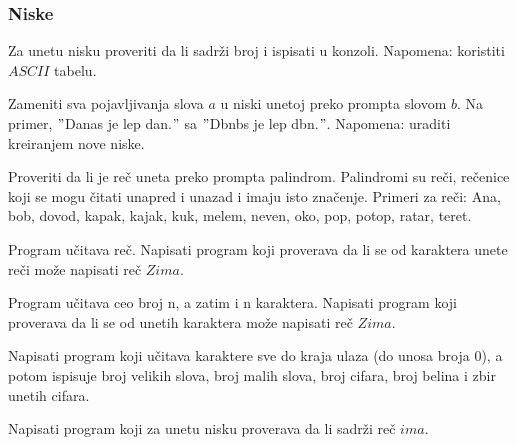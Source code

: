 \subsubsection{Niske}
\begin{primer}
Za unetu nisku proveriti da li sadrži broj i ispisati u konzoli. Napomena: koristiti $ASCII$ tabelu.
\end{primer}

\begin{primer}
Zameniti sva pojavljivanja slova $a$ u niski unetoj preko prompta slovom $b$. Na primer, $"$Danas je lep dan.$"$ sa $"$Dbnbs je lep dbn.$"$. Napomena: uraditi kreiranjem nove niske.
\end{primer}

\begin{primer}
Proveriti da li je reč uneta preko prompta palindrom. Palindromi su reči, rečenice koji se mogu čitati unapred i unazad i imaju isto značenje. Primeri za reči: Ana, bob, dovod, kapak, kajak, kuk, melem, neven, oko, pop, potop, ratar, teret. 
\end{primer}

\begin{primer}
Program učitava reč. Napisati
program koji proverava da li se od karaktera unete reči može napisati reč $Zima$.
\end{primer}

\begin{primer}
Program učitava ceo broj n, a zatim i n karaktera. Napisati
program koji proverava da li se od unetih karaktera može napisati reč $Zima$.
\end{primer}

\begin{primer}
Napisati program koji učitava karaktere sve do kraja ulaza (do unosa broja 0), a potom ispisuje broj velikih slova, broj malih slova, broj cifara, broj belina i zbir unetih cifara. 
\end{primer}

\begin{primer}
Napisati program koji za unetu nisku proverava da li sadrži reč $ima$.
\end{primer}

